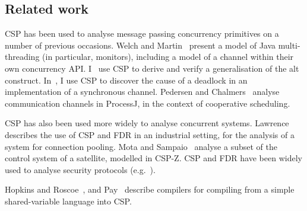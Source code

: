 
\subsection{Related work}

CSP has been used to analyse message passing concurrency primitives on a
number of previous occasions.
%
Welch and Martin~\cite{welch-martin} present a model of Java multi-threading
(in particular, monitors), including a model of a channel within their own
concurrency API\@.
%
I~\cite{gavin:alt} use CSP to derive and verify a generalisation of the
alt construct.  
%
In~\cite{gavin:OneOne}, I use CSP to discover the cause of a deadlock in an
implementation of a synchronous channel. 
%
Pedersen and Chalmers~\cite{PC23} analyse communication channels in ProcessJ,
in the context of cooperative scheduling.

CSP has also been used more widely to analyse concurrent systems. 
%
Lawrence~\cite{lawrence} describes the use of CSP and FDR in an
industrial setting, for the analysis of a system for connection pooling.
% 
Mota and Sampaio~\cite{mota+sampaio} analyse a subset of the
control system of a satellite, modelled in CSP-Z\@.  
%
CSP and FDR have been widely used to analyse security protocols
(e.g.~\cite{gavin:NSFDR}).

Hopkins and Roscoe~\cite{hopkins-roscoe}, and Pay~\cite{alex:project} describe
compilers for compiling from a simple shared-variable language into CSP\@.






